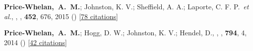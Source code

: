 \item[{\color{deemph}\scriptsize2}]\textbf{Price-Whelan,~A.~M.}; Johnston, K. V.; Sheffield, A. A.; Laporte, C. F. P.~\textit{et al.}, , \mnras, \textbf{452}, 676, 2015 () [\href{http://adsabs.harvard.edu/abs/2015MNRAS.452..676P}{78 citations}]

\item[{\color{deemph}\scriptsize1}]\textbf{Price-Whelan,~A.~M.}; Hogg, D. W.; Johnston, K. V.; Hendel, D., , \apj, \textbf{794}, 4, 2014 () [\href{http://adsabs.harvard.edu/abs/2014ApJ...794....4P}{42 citations}]